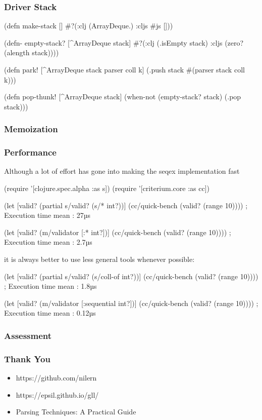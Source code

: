 \documentclass{beamer}
\begin{document}

\begin{frame}[fragile]
\frametitle{Driver Stack}

\begin{semiverbatim}
(defn make-stack []
  #?(:clj (ArrayDeque.)
     :cljs #js []))

(defn- empty-stack? [^ArrayDeque stack]
  #?(:clj (.isEmpty stack)
     :cljs (zero? (alength stack))))

(defn park! [^ArrayDeque stack parser coll k]
  (.push stack #(parser stack coll k)))

(defn pop-thunk! [^ArrayDeque stack]
  (when-not (empty-stack? stack) (.pop stack)))
\end{semiverbatim}

\end{frame}


\begin{frame}
\frametitle{Memoization}
\end{frame}


\begin{frame}[fragile]
\frametitle{Performance}

\begin{displayquote}
Although a lot of effort has gone into making the seqex implementation fast
\end{displayquote}

{\tiny
\begin{semiverbatim}
(require '[clojure.spec.alpha :as s])
(require '[criterium.core :as cc])

(let [valid? (partial s/valid? (s/* int?))]
  (cc/quick-bench (valid? (range 10)))) ; Execution time mean : 27µs

(let [valid? (m/validator [:* int?])]
  (cc/quick-bench (valid? (range 10)))) ; Execution time mean : 2.7µs
\end{semiverbatim}
}

\begin{displayquote}
it is always better to use less general tools whenever possible:
\end{displayquote}

{\tiny
\begin{semiverbatim}
(let [valid? (partial s/valid? (s/coll-of int?))]
  (cc/quick-bench (valid? (range 10)))) ; Execution time mean : 1.8µs

(let [valid? (m/validator [:sequential int?])]
  (cc/quick-bench (valid? (range 10)))) ; Execution time mean : 0.12µs
\end{semiverbatim}
}
\end{frame}


\begin{frame}
\frametitle{Assessment}
\end{frame}


\begin{frame}
\frametitle{Thank You}

\begin{itemize}
\item https://github.com/nilern
\item https://epsil.github.io/gll/
\item Parsing Techniques: A Practical Guide
\end{itemize}
\end{frame}
\end{document}
